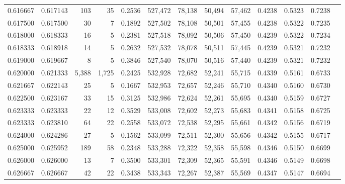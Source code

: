\begin{tabular}{rrrrrrrrrrrrr}
0.616667 & 0.617143 &    103 &    35 &                                     0.2536 & 527,472 &  78,138 &  50,494 &  57,462 & 0.4238 & 0.5323 & 0.7238 \\
0.617500 & 0.617500 &     30 &     7 &                                     0.1892 & 527,502 &  78,108 &  50,501 &  57,455 & 0.4238 & 0.5322 & 0.7235 \\
0.618000 & 0.618333 &     16 &     5 &                                     0.2381 & 527,518 &  78,092 &  50,506 &  57,450 & 0.4239 & 0.5322 & 0.7234 \\
0.618333 & 0.618918 &     14 &     5 &                                     0.2632 & 527,532 &  78,078 &  50,511 &  57,445 & 0.4239 & 0.5321 & 0.7232 \\
0.619000 & 0.619667 &      8 &     5 &                                     0.3846 & 527,540 &  78,070 &  50,516 &  57,440 & 0.4239 & 0.5321 & 0.7232 \\
0.620000 & 0.621333 &  5,388 & 1,725 &                                     0.2425 & 532,928 &  72,682 &  52,241 &  55,715 & 0.4339 & 0.5161 & 0.6733 \\
0.621667 & 0.622143 &     25 &     5 &                                     0.1667 & 532,953 &  72,657 &  52,246 &  55,710 & 0.4340 & 0.5160 & 0.6730 \\
0.622500 & 0.623167 &     33 &    15 &                                     0.3125 & 532,986 &  72,624 &  52,261 &  55,695 & 0.4340 & 0.5159 & 0.6727 \\
0.623333 & 0.623333 &     22 &    12 &                                     0.3529 & 533,008 &  72,602 &  52,273 &  55,683 & 0.4341 & 0.5158 & 0.6725 \\
0.623333 & 0.623810 &     64 &    22 &                                     0.2558 & 533,072 &  72,538 &  52,295 &  55,661 & 0.4342 & 0.5156 & 0.6719 \\
0.624000 & 0.624286 &     27 &     5 &                                     0.1562 & 533,099 &  72,511 &  52,300 &  55,656 & 0.4342 & 0.5155 & 0.6717 \\
0.625000 & 0.625952 &    189 &    58 &                                     0.2348 & 533,288 &  72,322 &  52,358 &  55,598 & 0.4346 & 0.5150 & 0.6699 \\
0.626000 & 0.626000 &     13 &     7 &                                     0.3500 & 533,301 &  72,309 &  52,365 &  55,591 & 0.4346 & 0.5149 & 0.6698 \\
0.626667 & 0.626667 &     42 &    22 &                                     0.3438 & 533,343 &  72,267 &  52,387 &  55,569 & 0.4347 & 0.5147 & 0.6694 \\

\end{tabular}
